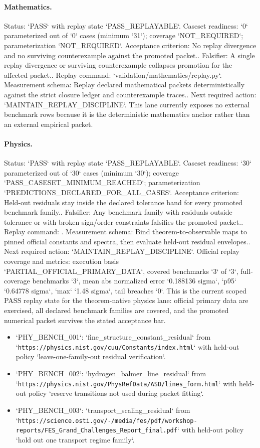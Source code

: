 \paragraph{Mathematics.}
Status: `PASS` with replay state `PASS\_REPLAYABLE`.
Caseset readiness: `0` parameterized out of `0` cases (minimum `31`); coverage `NOT\_REQUIRED`; parameterization `NOT\_REQUIRED`.
Acceptance criterion: No replay divergence and no surviving counterexample against the promoted packet..
Falsifier: A single replay divergence or surviving counterexample collapses promotion for the affected packet..
Replay command: `validation/mathematics/replay.py`.
Measurement schema: Replay declared mathematical packets deterministically against the strict closure ledger and counterexample traces..
Next required action: `MAINTAIN\_REPLAY\_DISCIPLINE`.
This lane currently exposes no external benchmark rows because it is the deterministic mathematics anchor rather than an external empirical packet.

\paragraph{Physics.}
Status: `PASS` with replay state `PASS\_REPLAYABLE`.
Caseset readiness: `30` parameterized out of `30` cases (minimum `30`); coverage `PASS\_CASESET\_MINIMUM\_REACHED`; parameterization `PREDICTIONS\_DECLARED\_FOR\_ALL\_CASES`.
Acceptance criterion: Held-out residuals stay inside the declared tolerance band for every promoted benchmark family..
Falsifier: Any benchmark family with residuals outside tolerance or with broken sign/order constraints falsifies the promoted packet..
Replay command: .
Measurement schema: Bind theorem-to-observable maps to pinned official constants and spectra, then evaluate held-out residual envelopes..
Next required action: `MAINTAIN\_REPLAY\_DISCIPLINE`.
Official replay coverage and metrics: execution basis `PARTIAL\_OFFICIAL\_PRIMARY\_DATA`, covered benchmarks `3` of `3`, full-coverage benchmarks `3`, mean abs normalized error `0.188136 sigma`, `p95` `0.64778 sigma`, `max` `1.48 sigma`, tail breaches `0`.
This is the current scoped PASS replay state for the theorem-native physics
lane: official primary data are exercised, all declared benchmark families are
covered, and the promoted numerical packet survives the stated acceptance bar.
\begin{itemize}
\item `PHY\_BENCH\_001`: `fine\_structure\_constant\_residual` from `\texttt{https://physics.nist.gov/cuu/Constants/index.html}` with held-out policy `leave-one-family-out residual verification`.
\item `PHY\_BENCH\_002`: `hydrogen\_balmer\_line\_residual` from `\texttt{https://physics.nist.gov/PhysRefData/ASD/lines\_form.html}` with held-out policy `reserve transitions not used during packet fitting`.
\item `PHY\_BENCH\_003`: `transport\_scaling\_residual` from `\texttt{https://science.osti.gov/-/media/fes/pdf/workshop-reports/FES\_Grand\_Challenges\_Report\_final.pdf}` with held-out policy `hold out one transport regime family`.
\end{itemize}

